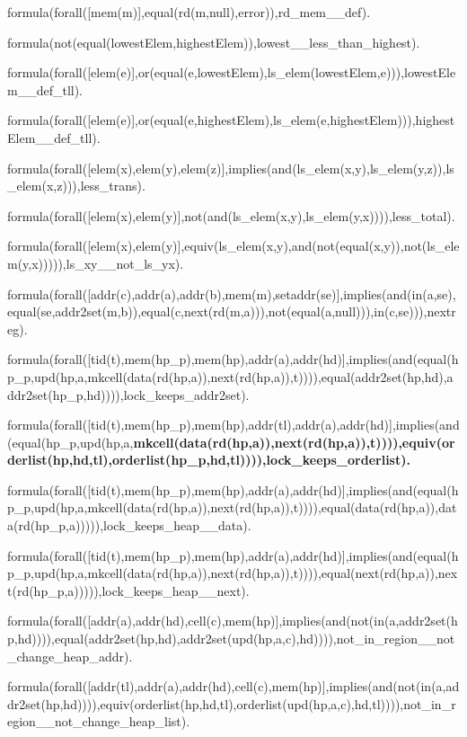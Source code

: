 formula(forall([mem(m)],equal(rd(m,null),error)),rd\_mem\_\_def).


formula(not(equal(lowestElem,highestElem)),lowest\_\_less\_than\_highest).

formula(forall([elem(e)],or(equal(e,lowestElem),ls\_elem(lowestElem,e))),lowestElem\_\_def\_tll).

formula(forall([elem(e)],or(equal(e,highestElem),ls\_elem(e,highestElem))),highestElem\_\_def\_tll).

formula(forall([elem(x),elem(y),elem(z)],implies(and(ls\_elem(x,y),ls\_elem(y,z)),ls\_elem(x,z))),less\_trans).

formula(forall([elem(x),elem(y)],not(and(ls\_elem(x,y),ls\_elem(y,x)))),less\_total).

formula(forall([elem(x),elem(y)],equiv(ls\_elem(x,y),and(not(equal(x,y)),not(ls\_elem(y,x))))),ls\_xy\_\_not\_ls\_yx).


formula(forall([addr(c),addr(a),addr(b),mem(m),setaddr(se)],implies(and(in(a,se),equal(se,addr2set(m,b)),equal(c,next(rd(m,a))),not(equal(a,null))),in(c,se))),nextreg).

formula(forall([tid(t),mem(hp\_p),mem(hp),addr(a),addr(hd)],implies(and(equal(hp\_p,upd(hp,a,mkcell(data(rd(hp,a)),next(rd(hp,a)),t)))),equal(addr2set(hp,hd),addr2set(hp\_p,hd)))),lock\_keeps\_addr2set).

formula(forall([tid(t),mem(hp\_p),mem(hp),addr(tl),addr(a),addr(hd)],implies(and(equal(hp\_p,upd(hp,a,\textbf{mkcell(data(rd(hp,a)),next(rd(hp,a)),t)))),equiv(orderlist(hp,hd,tl),orderlist(hp\_p,hd,tl)))),lock\_keeps\_orderlist).}

formula(forall([tid(t),mem(hp\_p),mem(hp),addr(a),addr(hd)],implies(and(equal(hp\_p,upd(hp,a,mkcell(data(rd(hp,a)),next(rd(hp,a)),t)))),equal(data(rd(hp,a)),data(rd(hp\_p,a))))),lock\_keeps\_heap\_\_data).

formula(forall([tid(t),mem(hp\_p),mem(hp),addr(a),addr(hd)],implies(and(equal(hp\_p,upd(hp,a,mkcell(data(rd(hp,a)),next(rd(hp,a)),t)))),equal(next(rd(hp,a)),next(rd(hp\_p,a))))),lock\_keeps\_heap\_\_next).

formula(forall([addr(a),addr(hd),cell(c),mem(hp)],implies(and(not(in(a,addr2set(hp,hd)))),equal(addr2set(hp,hd),addr2set(upd(hp,a,c),hd)))),not\_in\_region\_\_not\_change\_heap\_addr).

formula(forall([addr(tl),addr(a),addr(hd),cell(c),mem(hp)],implies(and(not(in(a,addr2set(hp,hd)))),equiv(orderlist(hp,hd,tl),orderlist(upd(hp,a,c),hd,tl)))),not\_in\_region\_\_not\_change\_heap\_list).

